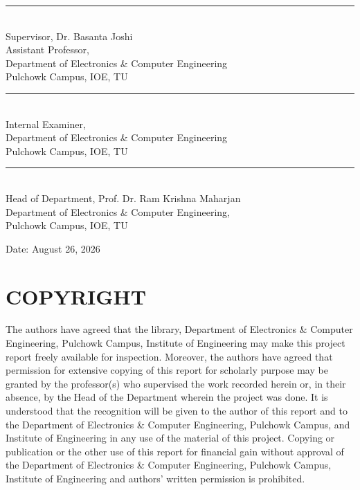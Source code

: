 \documentclass[12pt, a4paper]{report}
\begin{document}
\vspace{1.5cm}
\noindent\rule{8cm}{0.4pt}\\
Supervisor, Dr. Basanta Joshi\\
Assistant Professor, \\
Department of Electronics \& Computer Engineering\\
Pulchowk Campus, IOE, TU

\vspace{1.5cm}
\noindent\rule{8cm}{0.4pt}\\
Internal Examiner,\\
Department of Electronics \& Computer Engineering\\
Pulchowk Campus, IOE, TU

\vspace{1.5cm}
\noindent\rule{8cm}{0.4pt}\\
Head of Department, Prof. Dr. Ram Krishna Maharjan\\
Department of Electronics \& Computer Engineering,\\
Pulchowk Campus, IOE, TU

\vspace{1cm}
\noindent Date: August 26, 2026
\newpage

\chapter*{COPYRIGHT}

The authors have agreed that the library, Department of Electronics \& Computer Engineering, Pulchowk Campus, Institute of Engineering may make this project report freely available for inspection. Moreover, the authors have agreed that permission for extensive copying of this report for scholarly purpose may be granted by the professor(s) who supervised the work recorded herein or, in their absence, by the Head of the Department wherein the project was done. It is understood that the recognition will be given to the author of this report and to the Department of Electronics \& Computer Engineering, Pulchowk Campus, and Institute of Engineering in any use of the material of this project. Copying or publication or the other use of this report for financial gain without approval of the Department of Electronics \& Computer Engineering, Pulchowk Campus, Institute of Engineering and authors' written permission is prohibited.
\end{document}
